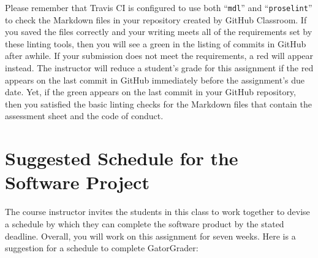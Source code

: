 \documentclass[11pt]{article}
\newcommand{\command}[1]{``\lstinline{#1}''}
\newcommand{\checkmark}{\ding{51}}
\newcommand{\naughtmark}{\ding{55}}
\begin{document}
Please remember that Travis CI is configured to use both \command{mdl} and
\command{proselint} to check the Markdown files in your repository created by
GitHub Classroom.
%
If you saved the files correctly and your writing meets all of the requirements
set by these linting tools, then you will see a green \checkmark{} in the
listing of commits in GitHub after awhile. If your submission does not meet the
requirements, a red \naughtmark{} will appear instead. The instructor will
reduce a student's grade for this assignment if the red \naughtmark{} appears on
the last commit in GitHub immediately before the assignment's due date. Yet, if
the green \checkmark{} appears on the last commit in your GitHub repository,
then you satisfied the basic linting checks for the Markdown files that contain
the assessment sheet and the code of conduct.

\section*{Suggested Schedule for the Software Project}

The course instructor invites the students in this class to work together to
devise a schedule by which they can complete the software product by the stated
deadline. Overall, you will work on this assignment for seven weeks. Here is a
suggestion for a schedule to complete GatorGrader:
\end{document}
